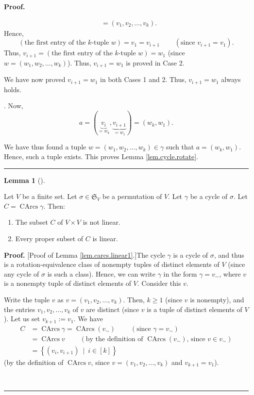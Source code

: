 \documentclass[numbers=enddot,12pt,final,onecolumn,notitlepage]{scrartcl}%
\numberwithin{exer}{section}
\theoremstyle{definition}
\newtheorem{lem}[theo]{Lemma}
\newenvironment{lemma}[1][]
{\begin{lem}[#1]\begin{leftbar}}
{\end{leftbar}\end{lem}}
\newenvironment{proof}[1][Proof]{\noindent\textbf{#1.} }{\ \rule{0.5em}{0.5em}}
\newenvironment{verlong}{}{}
\begin{document}
\begin{verlong}
\begin{proof}
{\begin{align*}
&  =\left(  v_{1},v_{2},\ldots,v_{k}\right)  .
\end{align*}
Hence,%
\[
\left(  \text{the first entry of the }k\text{-tuple }w\right)  =v_{1}%
=v_{i+1}\ \ \ \ \ \ \ \ \ \ \left(  \text{since }v_{i+1}=v_{1}\right)  .
\]
Thus, $v_{i+1}=\left(  \text{the first entry of the }k\text{-tuple }w\right)
=w_{1}$ (since $w=\left(  w_{1},w_{2},\ldots,w_{k}\right)  $). Thus,
$v_{i+1}=w_{1}$ is proved in Case 2.
\par
We have now proved $v_{i+1}=w_{1}$ in both Cases 1 and 2. Thus, $v_{i+1}%
=w_{1}$ always holds.}. Now,%
\[
a=\left(  \underbrace{v_{i}}_{=w_{k}},\underbrace{v_{i+1}}_{=w_{1}}\right)
=\left(  w_{k},w_{1}\right)  .
\]


We have thus found a tuple $w=\left(  w_{1},w_{2},\ldots,w_{k}\right)
\in\gamma$ such that $a=\left(  w_{k},w_{1}\right)  $. Hence, such a tuple
exists. This proves Lemma \ref{lem.cycle.rotate}.
\end{proof}

\begin{lemma}
\label{lem.carcs.linear1}Let $V$ be a finite set. Let $\sigma\in
\mathfrak{S}_{V}$ be a permutation of $V$. Let $\gamma$ be a cycle of $\sigma
$. Let $C=\operatorname*{CArcs}\gamma$. Then:

\begin{enumerate}
\item[\textbf{(a)}] The subset $C$ of $V\times V$ is not linear.

\item[\textbf{(b)}] Every proper subset of $C$ is linear.
\end{enumerate}
\end{lemma}

\begin{proof}
[Proof of Lemma \ref{lem.carcs.linear1}.]The cycle $\gamma$ is a cycle of
$\sigma$, and thus is a rotation-equivalence class of nonempty tuples of
distinct elements of $V$ (since any cycle of $\sigma$ is such a class). Hence,
we can write $\gamma$ in the form $\gamma=v_{\sim}$, where $v$ is a nonempty
tuple of distinct elements of $V$. Consider this $v$.

Write the tuple $v$ as $v=\left(  v_{1},v_{2},\ldots,v_{k}\right)  $. Then,
$k\geq1$ (since $v$ is nonempty), and the entries $v_{1},v_{2},\ldots,v_{k}$
of $v$ are distinct (since $v$ is a tuple of distinct elements of $V$). Let us
set $v_{k+1}:=v_{1}$. We have%
\begin{align}
C  &  =\operatorname*{CArcs}\gamma=\operatorname*{CArcs}\left(  v_{\sim
}\right)  \ \ \ \ \ \ \ \ \ \ \left(  \text{since }\gamma=v_{\sim}\right)
\nonumber\\
&  =\operatorname*{CArcs}v\ \ \ \ \ \ \ \ \ \ \left(  \text{by the definition
of }\operatorname*{CArcs}\left(  v_{\sim}\right)  \text{, since }v\in v_{\sim
}\right) \nonumber\\
&  =\left\{  \left(  v_{i},v_{i+1}\right)  \ \mid\ i\in\left[  k\right]
\right\}  \label{pf.lem.carcs.linear1.1}%
\end{align}
(by the definition of $\operatorname*{CArcs}v$, since $v=\left(  v_{1}%
,v_{2},\ldots,v_{k}\right)  $ and $v_{k+1}=v_{1}$). \medskip


\end{proof}
\end{verlong}
\end{document}
